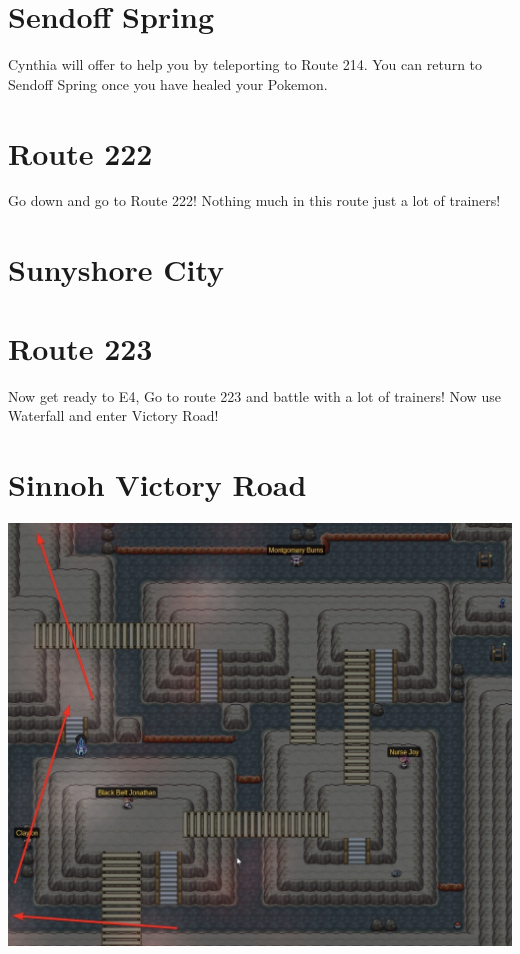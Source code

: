 \documentclass[11pt]{article}
\begin{document}
\section{Sendoff Spring}
Cynthia will offer to help you by teleporting to Route 214.
You can return to Sendoff Spring once you have healed your Pokemon.




\section{Route 222}\label{sec:route-222}
Go down and go to Route 222!
Nothing much in this route just a lot of trainers!




\section{Sunyshore City}\label{sec:sunyshore-city}

\section{Route 223}\label{sec:route-223}
Now get ready to E4, Go to route 223 and battle with a lot of trainers!
Now use Waterfall and enter Victory Road!




\section{Sinnoh Victory Road}\label{sec:sinnoh-victory-road}

\includegraphics[width=\textwidth]{walkthrough/Sinnoh/victory-road-1}
\end{document}

